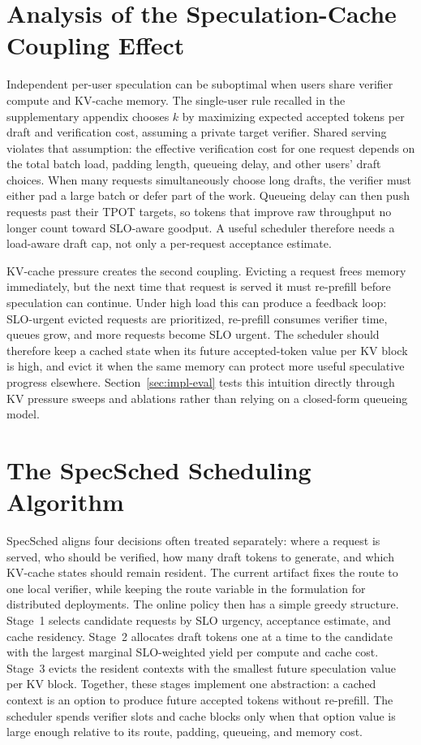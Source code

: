 \documentclass[journal]{IEEEtran}
\newcommand{\system}{SpecSched}
\begin{document}
\section{Analysis of the Speculation-Cache Coupling Effect}
\label{sec:analysis}

Independent per-user speculation can be suboptimal when users share
verifier compute and KV-cache memory. The single-user rule recalled in
the supplementary appendix chooses $k$ by maximizing expected
accepted tokens per draft and verification cost, assuming a private
target verifier. Shared serving violates that assumption: the effective
verification cost for one request depends on the total batch load,
padding length, queueing delay, and other users' draft choices. When
many requests simultaneously choose long drafts, the verifier must
either pad a large batch or defer part of the work. Queueing delay can
then push requests past their TPOT targets, so tokens that improve raw
throughput no longer count toward SLO-aware goodput. A useful scheduler
therefore needs a load-aware draft cap, not only a per-request
acceptance estimate.

KV-cache pressure creates the second coupling. Evicting a request frees
memory immediately, but the next time that request is served it must
re-prefill before speculation can continue. Under high load this can
produce a feedback loop: SLO-urgent evicted requests are prioritized,
re-prefill consumes verifier time, queues grow, and more requests become
SLO urgent. The scheduler should therefore keep a cached state when its
future accepted-token value per KV block is high, and evict it when the
same memory can protect more useful speculative progress elsewhere.
Section~\ref{sec:impl-eval} tests this intuition directly through KV
pressure sweeps and ablations rather than relying on a closed-form
queueing model.


\section{The \system{} Scheduling Algorithm}
\label{sec:algorithm}

\system{} aligns four decisions often treated separately: where a
request is served, who should be verified, how many draft tokens to
generate, and which KV-cache states should remain resident. The current
artifact fixes the route to one local verifier, while keeping the route
variable in the formulation for distributed deployments. The online
policy then has a simple greedy structure. Stage~1 selects candidate
requests by SLO urgency, acceptance estimate, and cache residency.
Stage~2 allocates draft tokens one at a time to the candidate with the
largest marginal SLO-weighted yield per compute and cache cost. Stage~3
evicts the resident contexts with the smallest future speculation value
per KV block. Together, these stages implement one abstraction: a
cached context is an option to produce future accepted tokens without
re-prefill. The scheduler spends verifier slots and cache blocks only
when that option value is large enough relative to its route, padding,
queueing, and memory cost.
\end{document}
